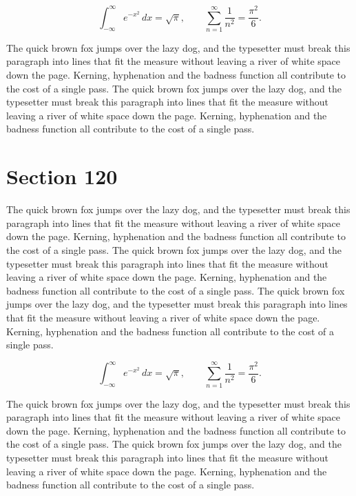 \documentclass{article}
\begin{document}
\begin{equation}
\int_{-\infty}^{\infty} e^{-x^{2}}\,dx = \sqrt{\pi}, \qquad
\sum_{n=1}^{\infty} \frac{1}{n^{2}} = \frac{\pi^{2}}{6}.
\end{equation}

The quick brown fox jumps over the lazy dog, and the typesetter must break this paragraph into lines that fit the measure without leaving a river of white space down the page. Kerning, hyphenation and the badness function all contribute to the cost of a single pass. The quick brown fox jumps over the lazy dog, and the typesetter must break this paragraph into lines that fit the measure without leaving a river of white space down the page. Kerning, hyphenation and the badness function all contribute to the cost of a single pass. 
\section{Section 120}
The quick brown fox jumps over the lazy dog, and the typesetter must break this paragraph into lines that fit the measure without leaving a river of white space down the page. Kerning, hyphenation and the badness function all contribute to the cost of a single pass. The quick brown fox jumps over the lazy dog, and the typesetter must break this paragraph into lines that fit the measure without leaving a river of white space down the page. Kerning, hyphenation and the badness function all contribute to the cost of a single pass. The quick brown fox jumps over the lazy dog, and the typesetter must break this paragraph into lines that fit the measure without leaving a river of white space down the page. Kerning, hyphenation and the badness function all contribute to the cost of a single pass. 

\begin{equation}
\int_{-\infty}^{\infty} e^{-x^{2}}\,dx = \sqrt{\pi}, \qquad
\sum_{n=1}^{\infty} \frac{1}{n^{2}} = \frac{\pi^{2}}{6}.
\end{equation}

The quick brown fox jumps over the lazy dog, and the typesetter must break this paragraph into lines that fit the measure without leaving a river of white space down the page. Kerning, hyphenation and the badness function all contribute to the cost of a single pass. The quick brown fox jumps over the lazy dog, and the typesetter must break this paragraph into lines that fit the measure without leaving a river of white space down the page. Kerning, hyphenation and the badness function all contribute to the cost of a single pass. 
\end{document}
